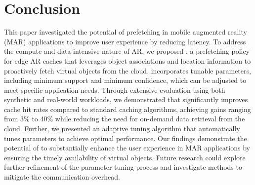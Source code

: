 \section{Conclusion}
\label{sec:conclude}
This paper investigated the potential of prefetching in mobile augmented reality (MAR) applications to improve user experience by reducing latency.  To address the compute and data intensive nature of AR, we proposed \spaarc{}, a prefetching policy for edge AR caches that leverages object associations and location information to proactively fetch virtual objects from the cloud. \spaarc{} incorporates tunable parameters, including minimum support and minimum confidence, which can be adjusted to meet specific application needs. 
Through extensive evaluation using both synthetic and real-world workloads, we demonstrated that \spaarc{} significantly improves cache hit rates compared to standard caching algorithms, achieving gains ranging from 3\% to 40\% while reducing the need for on-demand data retrieval from the cloud. Further, we presented an adaptive tuning algorithm that automatically tunes \spaarc{} parameters to achieve optimal performance. Our findings demonstrate the potential of \spaarc{} to substantially enhance the user experience in MAR applications by ensuring the timely availability of virtual objects.  Future research could explore further refinement of the parameter tuning process and investigate methods to mitigate the communication overhead.

